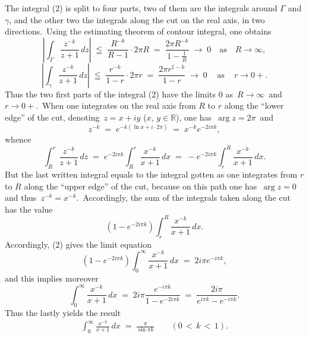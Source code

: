 \documentclass[12pt]{article}
\theoremstyle{definition}
\begin{document}
The integral (2) is split to four parts, two of them are the integrals around $\Gamma$ and $\gamma$, and the other two the integrals along the cut on the real axis, in two directions.\, Using the estimating theorem of contour integral, one obtains
$$\left|\int_\Gamma\!\frac{z^{-k}}{z\!+\!1}\,dz\right| \;\leqq\; \frac{R^{-k}}{R\!-\!1}\cdot2\pi R 
\;=\; \frac{2\pi R^{-k}}{1\!-\!\frac{1}{R}} \;\to\; 0 \quad \mbox{as} \quad R \to \infty,$$
$$\left|\int_\gamma\!\frac{z^{-k}}{z\!+\!1}\,dz\right| \;\leqq\; \frac{r^{-k}}{1\!-\!r}\cdot2\pi r 
\;=\; \frac{2\pi r^{1-k}}{1\!-\!r} \;\to\; 0 \,\quad \mbox{as} \,\quad r \to 0\!+\!.$$
Thus the two first parts of the integral (2) have the limits 0 as\, $R \to \infty$\, and\, $r \to 0\!+$.\, When one integrates on the real axis from $R$ to $r$ along the ``lower edge'' of the cut, denoting\, $z = x\!+\!iy$ ($x,\,y \in \mathbb{R}$), one has\, 
$\arg{z} = 2\pi$\, and
$$z^{-k} \;=\; e^{-k(\ln{x}+i\cdot2\pi)} \;=\; x^{-k}e^{-2i\pi k},$$
whence
$$\int_R^r\!\frac{z^{-k}}{z\!+\!1}\,dz \;=\; e^{-2i\pi k}\int_R^r\!\frac{x^{-k}}{x\!+\!1}\,dx 
\;=\; -e^{-2i\pi k}\int_r^R\!\frac{x^{-k}}{x\!+\!1}\,dx.$$
But the last written integral equals to the integral gotten as one integrates from $r$ to $R$ along the ``upper edge'' of the cut, because on this path one has\, $\arg{z} = 0$\, and thus\, $z^{-k} = x^{-k}$.\, Accordingly, the sum of the integrals taken along the cut has the value
$$\left(1-e^{-2i\pi k}\right)\!\int_r^R \frac{x^{-k}}{x\!+\!1}\,dx.$$
Accordingly, (2) gives the limit equation
$$\left(1-e^{-2i\pi k}\right)\!\int_0^\infty\!\frac{x^{-k}}{x\!+\!1}\,dx \;=\; 2i\pi e^{-i\pi k},$$
and this implies moreover
$$\int_0^\infty\!\frac{x^{-k}}{x\!+\!1}\,dx \;=\; 2i\pi\frac{e^{-i\pi k}}{1-e^{-2i\pi k}} 
\;=\; \frac{2i\pi}{e^{i\pi k}\!-\!e^{-i\pi k}}.$$
Thus the  lastly yields the result
\begin{align}
\int_0^\infty\!\frac{x^{-k}}{x\!+\!1}\,dx \;=\; \frac{\pi}{\sin{\pi k}} \qquad (0 \,<\, k \,<\, 1).
\end{align}
\end{document}
